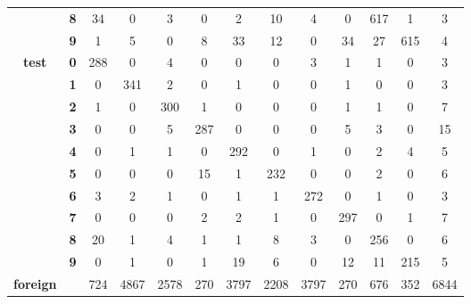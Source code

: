 \begin{table}[htp]
\begin{tabular}{|c|c|c|c|c|c|c|c|c|c|c|c|c|}
		& \textbf{8} & 34         & 0          & 3          & 0          & 2          & 10         & 4          & 0          & 617        & 1          & 3                \\ \cline{2-13} 
		& \textbf{9} & 1          & 5          & 0          & 8          & 33         & 12         & 0          & 34         & 27         & 615        & 4                \\ \hline
		\multirow{10}{*}{\textbf{test}}     & \textbf{0} & 288        & 0          & 4          & 0          & 0          & 0          & 3          & 1          & 1          & 0          & 3                \\ \cline{2-13} 
		& \textbf{1} & 0          & 341        & 2          & 0          & 1          & 0          & 0          & 1          & 0          & 0          & 3                \\ \cline{2-13} 
		& \textbf{2} & 1          & 0          & 300        & 1          & 0          & 0          & 0          & 1          & 1          & 0          & 7                \\ \cline{2-13} 
		& \textbf{3} & 0          & 0          & 5          & 287        & 0          & 0          & 0          & 5          & 3          & 0          & 15               \\ \cline{2-13} 
		& \textbf{4} & 0          & 1          & 1          & 0          & 292        & 0          & 1          & 0          & 2          & 4          & 5                \\ \cline{2-13} 
		& \textbf{5} & 0          & 0          & 0          & 15         & 1          & 232        & 0          & 0          & 2          & 0          & 6                \\ \cline{2-13} 
		& \textbf{6} & 3          & 2          & 1          & 0          & 1          & 1          & 272        & 0          & 1          & 0          & 3                \\ \cline{2-13} 
		& \textbf{7} & 0          & 0          & 0          & 2          & 2          & 1          & 0          & 297        & 0          & 1          & 7                \\ \cline{2-13} 
		& \textbf{8} & 20         & 1          & 4          & 1          & 1          & 8          & 3          & 0          & 256        & 0          & 6                \\ \cline{2-13} 
		& \textbf{9} & 0          & 1          & 0          & 1          & 19         & 6          & 0          & 12         & 11         & 215        & 5                \\ \hline
		\textbf{foreign}                    & \textbf{}  & 724        & 4867       & 2578       & 270        & 3797       & 2208       & 3797       & 270        & 676        & 352        & 6844             \\ \hline
	\end{tabular}
\end{table}

